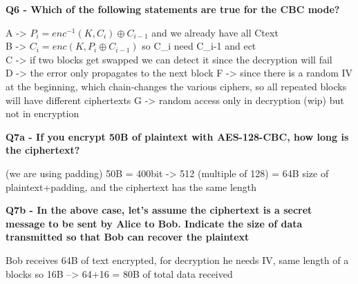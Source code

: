 \textbf{Q6 - Which of the following statements are true for the CBC mode?}
\textcolor{Comment}{
    A -> $P_{i} = enc^{-1}(K,C_{i})\oplus C_{i-1}$ and we already have all Ctext\\ 
    B -> $C_{i} = enc(K,P_{i}\oplus C_{i-1})$ so C_{i} need C_{i-1} and ect  \\
    C -> if two blocks get swapped we can detect it since the decryption will fail \\
    D -> the error only propagates to the next block
    F -> since there is a random IV at the beginning, which chain-changes the various ciphers, so all repeated blocks will have different ciphertexts 
    G -> random access only in decryption (wip) but not in encryption
}

\textbf{Q7a - If you encrypt 50B of plaintext with AES-128-CBC, how long is the ciphertext?}
\textcolor{Comment}{(we are using padding) 50B = 400bit -> 512 (multiple of 128) = 64B size of plaintext+padding, and the ciphertext has the same length }

\textbf{Q7b - In the above case, let’s assume the ciphertext is a secret message to be sent by Alice to Bob. Indicate the size of data transmitted so that Bob can recover the plaintext}
\textcolor{Comment}{Bob receives 64B of text encrypted, for decryption he needs IV, same length of a blocks so 16B --> 64+16 = 80B of total data received}

